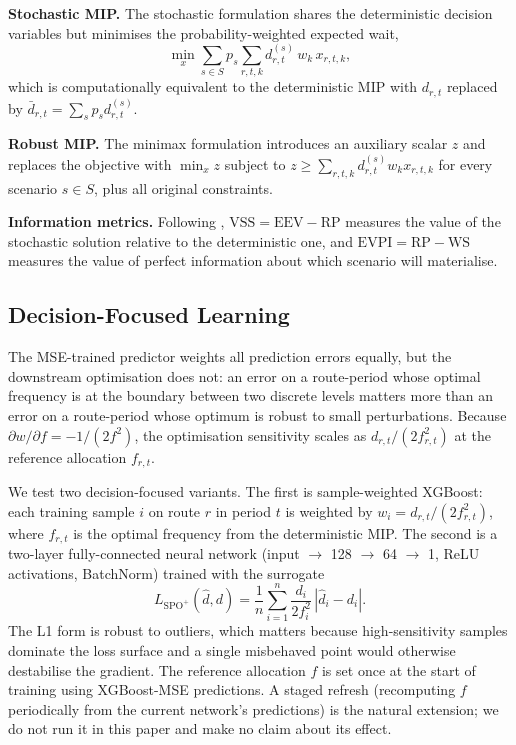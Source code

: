 \documentclass[a4paper,twoside]{article}
\begin{document}
\textbf{Stochastic MIP.} The stochastic formulation shares the
deterministic decision variables but minimises the
probability-weighted expected wait,
\begin{equation}
\min_x \sum_{s \in S} p_s \sum_{r,t,k} d^{(s)}_{r,t}\, w_k\, x_{r,t,k},
\end{equation}
which is computationally equivalent to the deterministic MIP with
$d_{r,t}$ replaced by $\bar{d}_{r,t} = \sum_s p_s d^{(s)}_{r,t}$.

\textbf{Robust MIP.} The minimax formulation introduces an
auxiliary scalar $z$ and replaces the objective with $\min_x z$
subject to $z \geq \sum_{r,t,k} d^{(s)}_{r,t} w_k x_{r,t,k}$ for
every scenario $s \in S$, plus all original constraints.

\textbf{Information metrics.} Following
\cite{birge2011introduction}, $\mathrm{VSS} = \mathrm{EEV} -
\mathrm{RP}$ measures the value of the stochastic solution
relative to the deterministic one, and $\mathrm{EVPI} =
\mathrm{RP} - \mathrm{WS}$ measures the value of perfect
information about which scenario will materialise.

\subsection{Decision-Focused Learning}
\label{sec:decisionfocused}

The MSE-trained predictor weights all prediction errors equally,
but the downstream optimisation does not: an error on a
route-period whose optimal frequency is at the boundary between
two discrete levels matters more than an error on a route-period
whose optimum is robust to small perturbations. Because
$\partial w/\partial f = -1/(2 f^2)$, the optimisation
sensitivity scales as $d_{r,t}/(2 f_{r,t}^2)$ at the reference
allocation $f_{r,t}$.

We test two decision-focused variants. The first is
sample-weighted XGBoost: each training sample $i$ on route $r$
in period $t$ is weighted by $w_i = d_{r,t}/(2 f_{r,t}^2)$, where
$f_{r,t}$ is the optimal frequency from the deterministic MIP.
The second is a two-layer fully-connected neural network (input
$\to$ 128 $\to$ 64 $\to$ 1, ReLU activations, BatchNorm) trained
with the surrogate
\begin{equation}\label{eq:surrogate}
L_{\mathrm{SPO}^+}(\hat{d}, d) = \frac{1}{n}\sum_{i=1}^{n}
  \frac{d_i}{2 f_i^2}\, |\hat{d}_i - d_i|.
\end{equation}
The L1 form is robust to outliers, which matters because
high-sensitivity samples dominate the loss surface and a single
misbehaved point would otherwise destabilise the gradient. The
reference allocation $f$ is set once at the start of training
using XGBoost-MSE predictions. A staged refresh (recomputing $f$
periodically from the current network's predictions) is the
natural extension; we do not run it in this paper and make no
claim about its effect.
\end{document}
